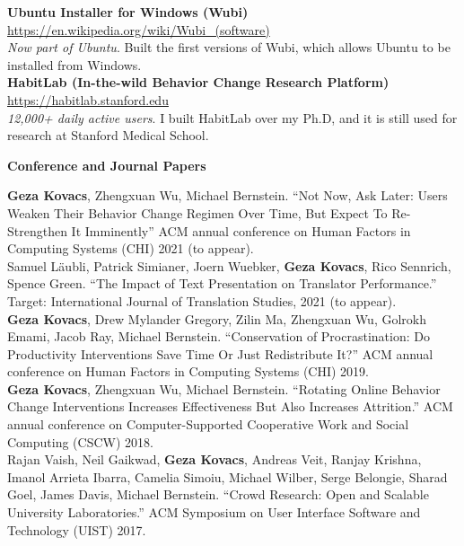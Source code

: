 \documentclass[10pt,A4]{article}
\newcommand{\cvsection}[1]
{
	\begin{center}
		\large\textcolor{sectcol}{\textbf{#1}}
	\end{center}
}
\begin{document}
\textbf{Ubuntu Installer for Windows (Wubi)} \hfill \url{https://en.wikipedia.org/wiki/Wubi_(software)}\\ %
\emph{Now part of Ubuntu}. Built the first versions of Wubi, which allows Ubuntu to be installed from Windows.\\ %

\textbf{HabitLab (In-the-wild Behavior Change Research Platform)} \hfill \url{https://habitlab.stanford.edu}\\ %
\emph{12,000+ daily active users}. I built HabitLab over my Ph.D, and it is still used for research at Stanford Medical School.\\ %


\cvsection{Conference and Journal Papers}

\textbf{Geza Kovacs}, Zhengxuan Wu, Michael Bernstein. ``Not Now, Ask Later: Users Weaken Their Behavior Change Regimen Over Time, But Expect To Re-Strengthen It Imminently'' ACM annual conference on Human Factors in Computing Systems (CHI) 2021 (to appear).\\ %

Samuel Läubli, Patrick Simianer, Joern Wuebker, \textbf{Geza Kovacs}, Rico Sennrich, Spence Green. ``The Impact of Text Presentation on Translator Performance.'' Target: International Journal of Translation Studies, 2021 (to appear).\\

\textbf{Geza Kovacs}, Drew Mylander Gregory, Zilin Ma, Zhengxuan Wu, Golrokh Emami, Jacob Ray, Michael Bernstein. ``Conservation of Procrastination: Do Productivity Interventions Save Time Or Just Redistribute It?'' ACM annual conference on Human Factors in Computing Systems (CHI) 2019.\\ %

\textbf{Geza Kovacs}, Zhengxuan Wu, Michael Bernstein. ``Rotating Online Behavior Change Interventions Increases Effectiveness But Also Increases Attrition.'' ACM annual conference on Computer-Supported Cooperative Work and Social Computing (CSCW) 2018.\\ %

Rajan Vaish, Neil Gaikwad, \textbf{Geza Kovacs}, Andreas Veit, Ranjay Krishna, Imanol Arrieta Ibarra, Camelia Simoiu, Michael Wilber, Serge Belongie, Sharad Goel, James Davis, Michael Bernstein. ``Crowd Research: Open and Scalable University Laboratories.'' ACM Symposium on User Interface Software and Technology (UIST) 2017.\\ %
\end{document}
